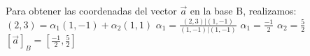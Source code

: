 \documentclass[preview]{standalone}
\begin{document}
\begin{center}
Para obtener las coordenadas del vector $\vec{a}$ en la base B, realizamos:  $(2,3) = \alpha_1 (1, -1) + \alpha_2 (1, 1)$ $\alpha_1 = \frac{(2,3)|(1,-1)}{(1, -1) | (1, -1)}$ $\alpha_1 = \frac{-1}{2}$ $\alpha_2 = \frac{5}{2}$ $[\vec{a}]_B =  [\frac{-1}{2}, \frac{5}{2}]$
\end{center}
\end{document}
